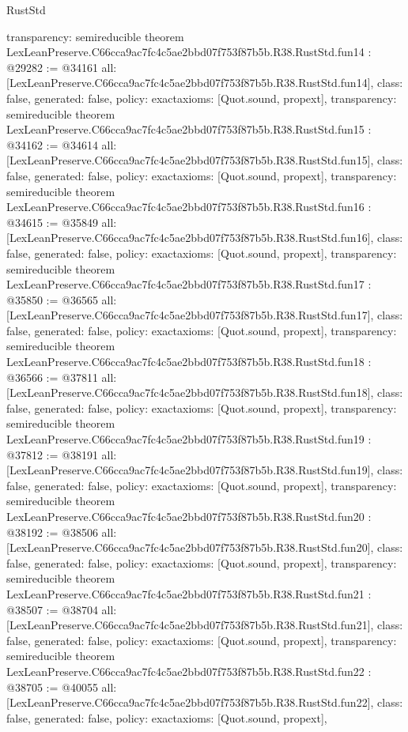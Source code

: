 \begin{lexlean}{RustStd}
\begin{coremodule}
{  transparency: semireducible
}
theorem LexLeanPreserve.C66cca9ac7fc4c5ae2bbd07f753f87b5b.R38.RustStd.fun14 : @29282 := @34161 {
  all: [LexLeanPreserve.C66cca9ac7fc4c5ae2bbd07f753f87b5b.R38.RustStd.fun14],
  class: false,
  generated: false,
  policy: exact{axioms: [Quot.sound, propext]},
  transparency: semireducible
}
theorem LexLeanPreserve.C66cca9ac7fc4c5ae2bbd07f753f87b5b.R38.RustStd.fun15 : @34162 := @34614 {
  all: [LexLeanPreserve.C66cca9ac7fc4c5ae2bbd07f753f87b5b.R38.RustStd.fun15],
  class: false,
  generated: false,
  policy: exact{axioms: [Quot.sound, propext]},
  transparency: semireducible
}
theorem LexLeanPreserve.C66cca9ac7fc4c5ae2bbd07f753f87b5b.R38.RustStd.fun16 : @34615 := @35849 {
  all: [LexLeanPreserve.C66cca9ac7fc4c5ae2bbd07f753f87b5b.R38.RustStd.fun16],
  class: false,
  generated: false,
  policy: exact{axioms: [Quot.sound, propext]},
  transparency: semireducible
}
theorem LexLeanPreserve.C66cca9ac7fc4c5ae2bbd07f753f87b5b.R38.RustStd.fun17 : @35850 := @36565 {
  all: [LexLeanPreserve.C66cca9ac7fc4c5ae2bbd07f753f87b5b.R38.RustStd.fun17],
  class: false,
  generated: false,
  policy: exact{axioms: [Quot.sound, propext]},
  transparency: semireducible
}
theorem LexLeanPreserve.C66cca9ac7fc4c5ae2bbd07f753f87b5b.R38.RustStd.fun18 : @36566 := @37811 {
  all: [LexLeanPreserve.C66cca9ac7fc4c5ae2bbd07f753f87b5b.R38.RustStd.fun18],
  class: false,
  generated: false,
  policy: exact{axioms: [Quot.sound, propext]},
  transparency: semireducible
}
theorem LexLeanPreserve.C66cca9ac7fc4c5ae2bbd07f753f87b5b.R38.RustStd.fun19 : @37812 := @38191 {
  all: [LexLeanPreserve.C66cca9ac7fc4c5ae2bbd07f753f87b5b.R38.RustStd.fun19],
  class: false,
  generated: false,
  policy: exact{axioms: [Quot.sound, propext]},
  transparency: semireducible
}
theorem LexLeanPreserve.C66cca9ac7fc4c5ae2bbd07f753f87b5b.R38.RustStd.fun20 : @38192 := @38506 {
  all: [LexLeanPreserve.C66cca9ac7fc4c5ae2bbd07f753f87b5b.R38.RustStd.fun20],
  class: false,
  generated: false,
  policy: exact{axioms: [Quot.sound, propext]},
  transparency: semireducible
}
theorem LexLeanPreserve.C66cca9ac7fc4c5ae2bbd07f753f87b5b.R38.RustStd.fun21 : @38507 := @38704 {
  all: [LexLeanPreserve.C66cca9ac7fc4c5ae2bbd07f753f87b5b.R38.RustStd.fun21],
  class: false,
  generated: false,
  policy: exact{axioms: [Quot.sound, propext]},
  transparency: semireducible
}
theorem LexLeanPreserve.C66cca9ac7fc4c5ae2bbd07f753f87b5b.R38.RustStd.fun22 : @38705 := @40055 {
  all: [LexLeanPreserve.C66cca9ac7fc4c5ae2bbd07f753f87b5b.R38.RustStd.fun22],
  class: false,
  generated: false,
  policy: exact{axioms: [Quot.sound, propext]},
}
\end{coremodule}
\end{lexlean}
